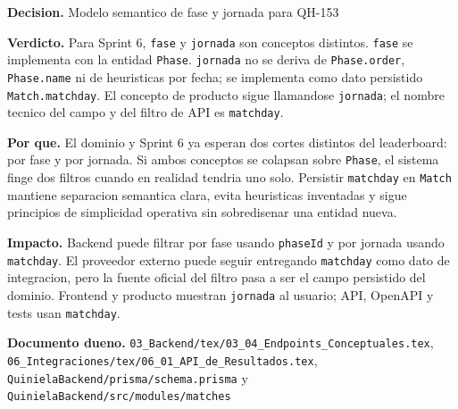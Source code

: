 \begin{docnote}
\textbf{Decision.} Modelo semantico de fase y jornada para QH-153

\textbf{Verdicto.} Para Sprint 6, \texttt{fase} y \texttt{jornada} son conceptos distintos. \texttt{fase} se implementa con la entidad \texttt{Phase}. \texttt{jornada} no se deriva de \texttt{Phase.order}, \texttt{Phase.name} ni de heuristicas por fecha; se implementa como dato persistido \texttt{Match.matchday}. El concepto de producto sigue llamandose \texttt{jornada}; el nombre tecnico del campo y del filtro de API es \texttt{matchday}.

\textbf{Por que.} El dominio y Sprint 6 ya esperan dos cortes distintos del leaderboard: por fase y por jornada. Si ambos conceptos se colapsan sobre \texttt{Phase}, el sistema finge dos filtros cuando en realidad tendria uno solo. Persistir \texttt{matchday} en \texttt{Match} mantiene separacion semantica clara, evita heuristicas inventadas y sigue principios de simplicidad operativa sin sobredisenar una entidad nueva.

\textbf{Impacto.} Backend puede filtrar por fase usando \texttt{phaseId} y por jornada usando \texttt{matchday}. El proveedor externo puede seguir entregando \texttt{matchday} como dato de integracion, pero la fuente oficial del filtro pasa a ser el campo persistido del dominio. Frontend y producto muestran \texttt{jornada} al usuario; API, OpenAPI y tests usan \texttt{matchday}.

\textbf{Documento dueno.} \texttt{03\_Backend/tex/03\_04\_Endpoints\_Conceptuales.tex}, \texttt{06\_Integraciones/tex/06\_01\_API\_de\_Resultados.tex}, \texttt{QuinielaBackend/prisma/schema.prisma} y \texttt{QuinielaBackend/src/modules/matches}
\end{docnote}

